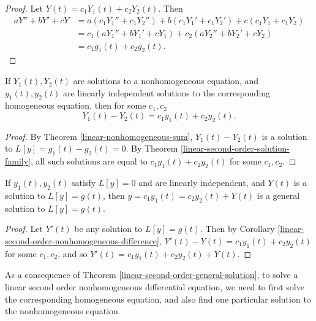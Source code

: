 \begin{proof}
    Let $Y(t) = c_1Y_1(t) + c_2Y_2(t)$. Then
    \begin{align*}
        aY'' + bY' + cY &= a(c_1Y_1'' + c_1Y_2'') + b(c_1Y_1' + c_1Y_2') + c(c_1Y_1 + c_1Y_2) \\
        &= c_1\left(aY_1'' + bY_1' + cY_1\right) + c_2\left(aY_2'' + bY_2' + cY_2\right) \\
        &= c_1g_1(t) + c_2g_2(t).
    \end{align*}
\end{proof}

\begin{cor}\label{linear-second-order-nonhomogeneous-difference}
    If $Y_1(t), Y_2(t)$ are solutions to a nonhomogeneous equation, and $y_1(t), y_2(t)$ are linearly independent solutions to the corresponding homogeneous equation, then for some $c_1, c_2$
    \[Y_1(t) - Y_2(t) = c_1y_1(t) + c_2y_2(t).\]
\end{cor}

\begin{proof}
    By Theorem \ref{linear-nonhomogeneous-sum}, $Y_1(t) - Y_2(t)$ is a solution to $L[y] = g_1(t) - g_2(t) = 0$. By Theorem \ref{linear-second-order-solution-family}, all such solutions are equal to $c_1y_1(t) + c_2y_2(t)$ for some $c_1, c_2$.
\end{proof}

\begin{thm}\label{linear-second-order-general-solution}
    If $y_1(t), y_2(t)$ satisfy $L[y] = 0$ and are linearly independent, and $Y(t)$ is a solution to $L[y] = g(t)$, then $y = c_1y_1(t) = c_2y_2(t) + Y(t)$ is a general solution to $L[y] = g(t)$.
\end{thm}

\begin{proof}
    Let $Y'(t)$ be any solution to $L[y] = g(t)$. Then by Corollary \ref{linear-second-order-nonhomogeneous-difference}, $Y'(t) - Y(t) = c_1y_1(t) + c_2y_2(t)$ for some $c_1, c_2$, and so $Y'(t) = c_1y_1(t) + c_2y_2(t) + Y(t)$.
\end{proof}

\begin{rmk}
    As a consequence of Theorem \ref{linear-second-order-general-solution}, to solve a linear second order nonhomogeneous differential equation, we need to first solve the corresponding homogeneous equation, and also find one particular solution to the nonhomogeneous equation.
\end{rmk}

